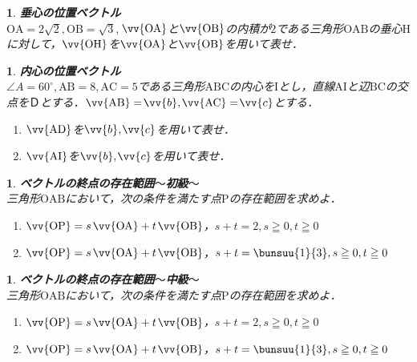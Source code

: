 \documentclass[10pt,
fleqn,
dvipdfmx,
uplatex
]{jsarticle}
\newtheorem{question}[Question]{}
\begin{document}
\begin{question}{\bf\boldmath 垂心の位置ベクトル}\\
$\text{OA}=2\sqrt 2, \text{OB}=\sqrt 3,$$\vv{\text{OA}}$と$\vv{\text{OB}}$の内積が$2$である三角形$\text{OAB}$の垂心$\text{H}$に対して，$\vv{\text{OH}}$を$\vv{\text{OA}}$と$\vv{\text{OB}}$を用いて表せ．
\end{question}



\begin{question}{\bf\boldmath 内心の位置ベクトル}\\
$\angle A={60}^\circ , \text{AB}=8, \text{AC}=5$である三角形$\text{ABC}$の内心を$\text{I}$とし，直線$\text{AI}$と辺$\text{BC}$の交点を$Ｄ$とする．$\vv{\text{AB}} =$$\vv{b},$$\vv{\text{AC}} =$$\vv{c}$とする．
\begin{enumerate}
\item$\vv{\text{AD}}$を$\vv{b},$$\vv{c}$を用いて表せ．
\item$\vv{\text{AI}}$を$\vv{b},$$\vv{c}$を用いて表せ．
\end{enumerate}

\end{question}



\begin{question}{\bf\boldmath ベクトルの終点の存在範囲$〜$初級$〜$}\\
三角形$\text{OAB}$において，次の条件を満たす点$\text{P}$の存在範囲を求めよ．
\begin{enumerate}
\item$\vv{\text{OP}} =s$$\vv{\text{OA}} +t$$\vv{\text{OB}}$，$s+t=2, s\geqq 0, t\geqq 0$
\item$\vv{\text{OP}} =s$$\vv{\text{OA}} +t$$\vv{\text{OB}}$，$s+t=\bunsuu{1}{3}, s\geqq 0, t\geqq 0$
\end{enumerate}

\end{question}



\begin{question}{\bf\boldmath ベクトルの終点の存在範囲$〜$中級$〜$}\\
三角形$\text{OAB}$において，次の条件を満たす点$\text{P}$の存在範囲を求めよ．
\begin{enumerate}
\item$\vv{\text{OP}} =s$$\vv{\text{OA}} +t$$\vv{\text{OB}}$，$s+t=2, s\geqq 0, t\geqq 0$
\item$\vv{\text{OP}} =s$$\vv{\text{OA}} +t$$\vv{\text{OB}}$，$s+t=\bunsuu{1}{3}, s\geqq 0, t\geqq 0$
\end{enumerate}

\end{question}
\end{document}
